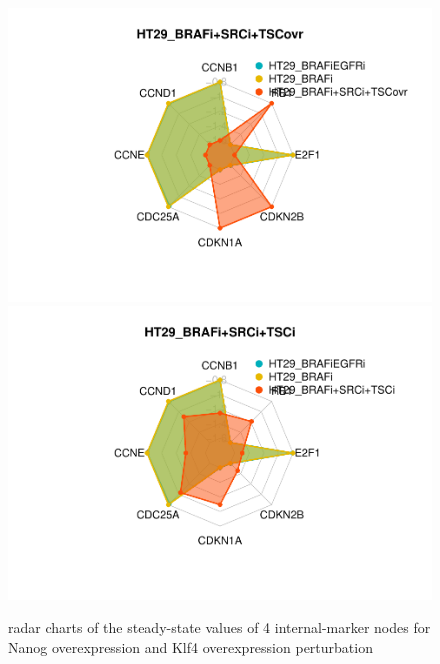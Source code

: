 \documentclass[
]{book}
\begin{document}
\begin{figure}
\includegraphics[width=0.5\linewidth]{_main_files/figure-latex/crc-chartsprolif-1} \includegraphics[width=0.5\linewidth]{_main_files/figure-latex/crc-chartsprolif-2} \caption{radar charts of the steady-state values of 4 internal-marker nodes for Nanog overexpression and Klf4 overexpression perturbation}\label{fig:crc-chartsprolif}
\end{figure}
\end{document}
